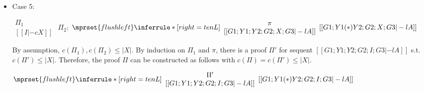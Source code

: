 \begin{itemize}
\item Case 5:
      \begin{center}
        \scriptsize
        \begin{math}
          \begin{array}{c}
            \Pi_1 \\
            {[[I |-c X]]}
          \end{array}
        \end{math}
        \qquad\qquad
        $\Pi_2$:
        \begin{math}
          $$\mprset{flushleft}
          \inferrule* [right={\tiny tenL}] {
            {
              \begin{array}{c}
                \pi \\
                {[[G1; Y1; Y2; G2; X; G3 |-l A]]}
              \end{array}
            }
          }{[[G1; Y1 (*) Y2; G2; X; G3 |-l A]]}
        \end{math}
      \end{center}
      By assumption, $c(\Pi_1),c(\Pi_2)\leq |X|$. By induction on $\Pi_1$
      and $\pi$, there is a proof $\Pi'$ for sequent
      $[[G1; Y1; Y2; G2; I; G3 |-l A]]$ s.t. $c(\Pi') \leq |X|$. Therefore,
      the proof $\Pi$ can be constructed as follows with
      $c(\Pi) = c(\Pi') \leq |X|$.
      \begin{center}
        \scriptsize
        \begin{math}
          $$\mprset{flushleft}
          \inferrule* [right={\tiny tenL}] {
            {
              \begin{array}{c}
                \Pi' \\
                {[[G1; Y1; Y2; G2; I; G3 |-l A]]}
              \end{array}
            }
          }{[[G1; Y1 (*) Y2; G2; I; G3 |-l A]]}
        \end{math}
      \end{center}


\end{itemize}
